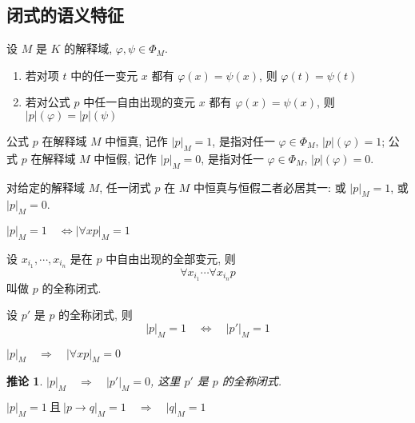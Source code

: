 \documentclass[
    mode=hazy,
    color=blue,
    device=normal,
    lang=cn
]{elegantnote}
\newtheorem{deduction}{推论}[section]
\begin{document}
\subsection{闭式的语义特征}
\begin{proposition}
    设 $M$ 是 $K$ 的解释域, $\varphi, \psi\in\Phi_M$.
    \begin{enumerate}[label = $\arabic*^\circ$]
        \item 若对项 $t$ 中的任一变元 $x$ 都有 $\varphi(x)=\psi(x)$, 则 $\varphi(t)=\psi(t)$
        \item 若对公式 $p$ 中任一自由出现的变元 $x$ 都有 $\varphi(x)=\psi(x)$, 则 $\lvert p\rvert (\varphi)=\lvert p\rvert (\psi)$
    \end{enumerate}
\end{proposition}
\begin{definition}[公式在解释域中恒真与恒假]
    公式 $p$ 在解释域 $M$ 中恒真, 记作 $\lvert p\rvert_M=1$, 是指对任一 $\varphi\in\Phi_M$, $\lvert p\rvert (\varphi)=1$;
    公式 $p$ 在解释域 $M$ 中恒假, 记作 $\lvert p\rvert_M=0$, 是指对任一 $\varphi\in\Phi_M$, $\lvert p\rvert (\varphi)=0$.
\end{definition}
\begin{theorem}
    对给定的解释域 $M$, 任一闭式 $p$ 在 $M$ 中恒真与恒假二者必居其一: 或 $\lvert p\rvert_M=1$, 或 $\lvert p\rvert_M=0$.
\end{theorem}
\begin{proposition}
    $\lvert p\rvert_M=1\quad\Leftrightarrow \lvert\forall xp\rvert_M=1$
\end{proposition}
\begin{definition}[全称闭式]
    设 $x_{i_1}, \cdots, x_{i_n}$ 是在 $p$ 中自由出现的全部变元, 则
    $$
        \forall x_{i_1}\cdots\forall x_{i_n} p
    $$
    叫做 $p$ 的全称闭式.
\end{definition}
\begin{proposition}
    设 $p'$ 是 $p$ 的全称闭式, 则
    $$
        \lvert p\rvert_M=1\quad\Leftrightarrow\quad\lvert p'\rvert_M = 1
    $$
\end{proposition}
\begin{proposition}
    $\lvert p\rvert_M\quad\Rightarrow\quad \lvert\forall xp\rvert_M=0$
\end{proposition}
\begin{deduction}
    $\lvert p\rvert_M\quad\Rightarrow\quad \lvert p'\rvert_M=0$, 这里 $p'$ 是 $p$ 的全称闭式.
\end{deduction}
\begin{proposition}
    $\lvert p\rvert_M=1\ \text{且}\ \lvert p\to q\rvert_M = 1\quad\Rightarrow\quad \lvert q\rvert_M=1$
\end{proposition}
\end{document}
